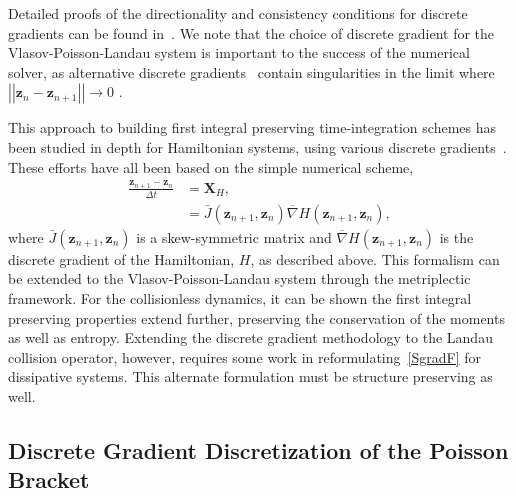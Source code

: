 \documentclass[preprint,12pt]{elsarticle}
\theoremstyle{definition}
\begin{document}
Detailed proofs of the directionality and consistency conditions for discrete gradients can be found in~\cite{Gonzalez1996,Mansfield2009}. We note that the choice of discrete gradient for the Vlasov-Poisson-Landau system is important to the success of the numerical solver, as alternative discrete gradients~\cite{Gonzalez1996,Itoh1988} contain singularities in the limit where $\left|\left|\boldsymbol{z}_n-\boldsymbol{z}_{n+1}\right|\right|\rightarrow 0$ \cite{Liu2023}. 



This approach to building first integral preserving time-integration schemes has been studied in depth for Hamiltonian systems, using various discrete gradients~\cite{Quispel1996, McLachlan1999, Norton2014, Mclaren2004, Mansfield2009}. These efforts have all been based on the simple numerical scheme, 
\begin{align}\label{SgradF}
\frac{\boldsymbol{z}_{n+1} - \boldsymbol{z}_{n}}{\Delta t} &= \boldsymbol{X}_H, \\
&= \bar{J} (\boldsymbol{z}_{n+1}, \boldsymbol{z}_{n}) \overline{\nabla} H (\boldsymbol{z}_{n+1}, \boldsymbol{z}_{n}),\nonumber
\end{align}
where $\bar{J} (\boldsymbol{z}_{n+1}, \boldsymbol{z}_{n})$ is a skew-symmetric matrix and $\overline{\nabla} H (\boldsymbol{z}_{n+1}, \boldsymbol{z}_{n})$ is the discrete gradient of the Hamiltonian, $H$, as described above. 
This formalism can be extended to the Vlasov-Poisson-Landau system through the metriplectic framework. For the collisionless dynamics, it can be shown the first integral preserving properties extend further, preserving the conservation of the moments as well as entropy. Extending the discrete gradient methodology to the Landau collision operator, however, requires some work in reformulating~\eqref{SgradF} for dissipative systems. This alternate formulation must be structure preserving as well.

\subsection{Discrete Gradient Discretization of the Poisson Bracket}
\end{document}

